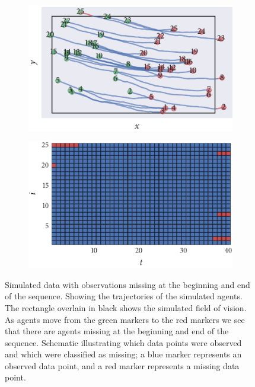 \begin{figure}[tbp]
  \begin{subfigure}[b]{0.5\textwidth}
    \includegraphics{both/data.pdf}
    \caption{}
    \label{subfig:both_data}
  \end{subfigure}%
  \begin{subfigure}[b]{0.5\textwidth}
    \includegraphics{both/missing_array.pdf}
    \caption{}
    \label{subfig:both_missing}
  \end{subfigure}
  \caption{Simulated data with observations missing at the beginning and end of
    the sequence.  Showing the trajectories of the
    simulated agents. The rectangle overlain in black shows the simulated
    field of vision. As agents move from the green markers to the red markers
    we see that there are agents missing at the beginning and end of the
    sequence.  Schematic illustrating which data
    points were observed and which were classified as missing; a blue marker
    represents an observed data point, and a red marker represents a missing data
    point.}
  \label{fig:both_data}
\end{figure}

